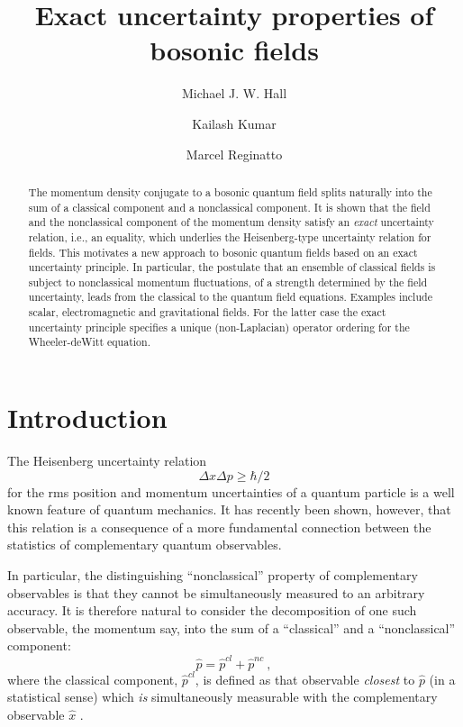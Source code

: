 \documentclass[a4paper,preprint, showpacs, aps, draft]{revtex4}
\begin{document}
\title{Exact uncertainty properties of bosonic fields}
\author{Michael J. W. Hall}
\author{Kailash Kumar}
\author{Marcel Reginatto}
\begin{abstract}
The momentum density conjugate to a bosonic quantum field splits naturally
into the sum of a classical component and a nonclassical component.  It
is shown that the field and the nonclassical component of the momentum
density satisfy an {\it exact}
uncertainty relation, i.e., an equality, which underlies 
the Heisenberg-type uncertainty relation for fields.
This motivates a new approach to bosonic 
quantum fields based on an exact uncertainty principle.  In particular,
the postulate that an ensemble of classical fields is subject to
nonclassical 
momentum fluctuations, of a strength determined by the field
uncertainty, leads from the classical to the quantum field equations.
Examples include scalar, electromagnetic and gravitational fields.  For
the latter case the exact uncertainty principle specifies a unique
(non-Laplacian) operator ordering for the Wheeler-deWitt equation. 
\end{abstract}
\maketitle

\section{Introduction}

The Heisenberg uncertainty relation
\begin{equation} \label{hur}
\Delta x \Delta p \geq \hbar/2
\end{equation}
for the rms position and momentum uncertainties of a quantum particle is
a well known feature of quantum mechanics. It has recently 
been shown, however, that this relation is a consequence of a more
fundamental connection between the statistics of complementary quantum
observables.

In particular, the distinguishing ``nonclassical'' 
property of complementary observables is
that they cannot be simultaneously measured to an arbitrary accuracy.
It is therefore natural to consider the decomposition of one such
observable, the momentum say, into the sum of a ``classical'' and a
``nonclassical'' component: 
\[ \hat{p} = \hat{p}^{cl} + \hat{p}^{nc}~, \]
where the classical component, $\hat{p}^{cl}$, is defined as that observable
{\it closest} to $\hat{p}$ (in a statistical sense) which {\it is} 
simultaneously
measurable with the complementary observable $\hat{x}$ \cite{eur}.  
\end{document}
